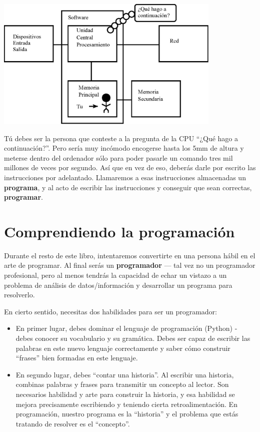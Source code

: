 \beforefig
\centerline{\includegraphics[height=2.50in]{figs2/arch2.eps}}
\afterfig

Tú debes ser la persona que conteste a la pregunta de la CPU ``¿Qué hago a continuación?''.
Pero sería muy incómodo encogerse hasta los 5mm de altura
y meterse dentro del ordenador sólo para poder pasarle un comando
tres mil millones de veces por segundo. Así que en vez de eso,
deberás darle por escrito las instrucciones por adelantado.
Llamaremos a esas instrucciones almacenadas un {\bf programa}, y al acto
de escribir las instrucciones y conseguir que
sean correctas, {\bf programar}.

\section{Comprendiendo la programación}

Durante el resto de este libro, intentaremos convertirte en una persona
hábil en el arte de programar. Al final serás un
{\bf programador} --- tal vez no un programador profesional, pero
al menos tendrás la capacidad de echar un vistazo a un problema de análisis
de datos/información y desarrollar un programa para resolverlo.


En cierto sentido, necesitas dos habilidades para ser un programador:

\begin{itemize}

\item En primer lugar, debes dominar el lenguaje de programación (Python) -
debes conocer su vocabulario y su gramática. Debes ser capaz de escribir
las palabras en este nuevo lenguaje correctamente y saber cómo construir
``frases'' bien formadas en este lenguaje.

\item En segundo lugar, debes ``contar una historia''. Al escribir una historia,
combinas palabras y frases para transmitir un concepto al lector.
Son necesarios habilidad y arte para construir la historia, y esa habilidad
se mejora precisamente escribiendo y teniendo cierta retroalimentación.
En programación, nuestro programa es la ``historia'' y el problema
que estás tratando de resolver es el ``concepto''.

\end{itemize}


